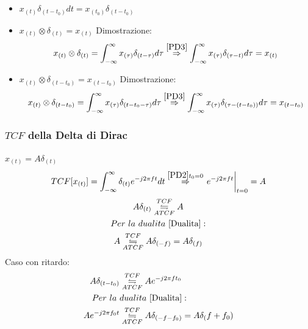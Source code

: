 \begin{itemize}
{                    }\label{PD3}
                    \item {
                        $x_{(t)}\delta_{(t-t_0)} dt = x_{(t_0)}\delta_{(t-t_0)}  $
                    }\label{PD4}
                    \item {
                        $x_{(t)} \otimes \delta_{(t)} = x_{(t)}$
                        Dimostrazione:
                        \[x_{(t)} \otimes \delta_{(t)} = \int_{-\infty}^{\infty}x_{(\tau)}\delta_{(t-\tau)} d\tau \overset{\ref{PD3}}{\Rightarrow} \int_{-\infty}^{\infty}x_{(\tau)}\delta_{(\tau-t)} d\tau = x_{(t)}\]
                    }\label{PD5}
                    \item {
                        $x_{(t)} \otimes \delta_{(t-t_0)} = x_{(t-t_0)}$
                        Dimostrazione:
                        \[x_{(t)} \otimes \delta_{(t-t_0)} = \int_{-\infty}^{\infty}x_{(\tau)}\delta_{(t-t_0-\tau)} d\tau \overset{\ref{PD3}}{\Rightarrow} \int_{-\infty}^{\infty}x_{(\tau)}\delta_{(\tau-(t-t_0))} d\tau = x_{(t-t_0)}\]
                    }\label{PD6}
                \end{itemize}
        \subsubsection{$TCF$ della Delta di Dirac}\label{TCF della Delta di Dirac}
                $x_{(t)} = A\delta_{(t)}$
                \[
                    TCF[x_{(t)}] = \int_{-\infty}^{\infty}\delta_{(t)}e^{-j2\pi ft} dt \overset{\ref{PD2} t_0=0}{\Rightarrow} \eval{e^{-j2\pi ft}}_{t=0} = A
                \]
                \begin{gather}
                        A\delta_{(t)} \overunderset{TCF}{ATCF}{\leftrightharpoons} A \nonumber \\
                        Per\ la\ dualita\ \ref{Dualita}: \nonumber \\
                        A \overunderset{TCF}{ATCF}{\leftrightharpoons} A\delta_{(-f)} = A\delta_{(f)}  \nonumber 
                \end{gather}
                Caso con ritardo:
                \begin{align}
                    A\delta_{(t-t_0)} &\overunderset{TCF}{ATCF}{\leftrightharpoons} Ae^{-j2\pi ft_0} \nonumber \\
                    Per\ la\ &dualita\ \ref{Dualita}: \nonumber \\
                    Ae^{-j2\pi f_0t} &\overunderset{TCF}{ATCF}{\leftrightharpoons} A\delta_{(-f-f_0)} =  A\delta_(f+f_0) \nonumber 
                \end{align}
